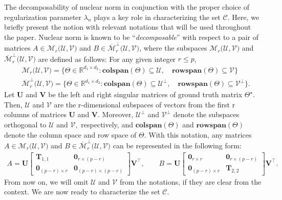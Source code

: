 \documentclass[12pt]{article}
\begin{document}
The decomposability of nuclear norm in conjunction with the proper choice of regularization parameter $\lambda_{n}$ plays a key role in characterizing the set $\mathcal{C}$.
Here, we briefly present the notion with relevant notations that will be used throughout the paper.
Nuclear norm is known to be ``\textit{decomposable}'' with respect to a pair of matrices $A\in\mathcal{M}_{r}\big( \mathcal{U}, \mathcal{V} \big)$ and $B\in\overline{\mathcal{M}}_{r}^{\perp}\big( \mathcal{U}, \mathcal{V} \big)$, where the subspaces $\mathcal{M}_{r}\big( \mathcal{U}, \mathcal{V} \big)$ and $\overline{\mathcal{M}}_{r}^{\perp}\big( \mathcal{U}, \mathcal{V} \big)$ are defined as follows:
For any given integer $r\leq p$, 
\begin{align}
    &\mathcal{M}_{r}\big( \mathcal{U}, \mathcal{V} \big) = \big\{ \Theta\in\mathbb{R}^{d_{1} \times d_{2}} : \textbf{colspan}(\Theta) \subseteq \mathcal{U},\quad  \textbf{rowspan}(\Theta) \subseteq \mathcal{V}  \big\} \label{M} \\
    &\overline{\mathcal{M}}_{r}^{\perp}\big( \mathcal{U}, \mathcal{V} \big) = \big\{ \Theta\in\mathbb{R}^{d_{1} \times d_{2}} : \textbf{colspan}(\Theta) \subseteq \mathcal{U}^{\perp},\quad  \textbf{rowspan}(\Theta) \subseteq \mathcal{V}^{\perp} \big\}.
    \label{M_perp}
\end{align}
Let $\mathbf{U}$ and $\mathbf{V}$ be the left and right singular matrices of ground truth matrix $\Theta^{\star}$.
Then, $\mathcal{U}$ and $\mathcal{V}$ are the r-dimensional subspaces of vectors from the first r columns of matrices $\mathbf{U}$ and $\mathbf{V}$. 
Moreover, $\mathcal{U}^{\perp}$ and $\mathcal{V}^{\perp}$ denote the subspaces orthogonal to  $\mathcal{U}$ and $\mathcal{V},$ respectively, and $\textbf{colspan}(\Theta)$ and $\textbf{rowspan}(\Theta)$ denote the column space and row space of $\Theta$.
With this notation, any matrices $A\in\mathcal{M}_{r}\big( \mathcal{U}, \mathcal{V} \big)$ and $B\in\overline{\mathcal{M}}_{r}^{\perp}\big( \mathcal{U}, \mathcal{V} \big)$ can be represented in the following form:
\begin{align*}
    A = \mathbf{U}
    \begin{bmatrix}
        \mathbf{T}_{1,1} & \mathbf{0}_{r\times (p-r)} \\
        \mathbf{0}_{(p-r) \times r} & \mathbf{0}_{(p-r) \times (p-r)} 
    \end{bmatrix}
    \mathbf{V}^{\top}, \qquad
    B = \mathbf{U}
    \begin{bmatrix}
        \mathbf{0}_{r \times r} & \mathbf{0}_{r\times (p-r)} \\
        \mathbf{0}_{(p-r) \times r} & \mathbf{T}_{2,2}
    \end{bmatrix}
    \mathbf{V}^{\top}.
\end{align*}
From now on, we will omit $\mathcal{U}$ and $\mathcal{V}$ from the notations, if they are clear from the context. 
We are now ready to characterize the set $\mathcal{C}$. 
\end{document}
